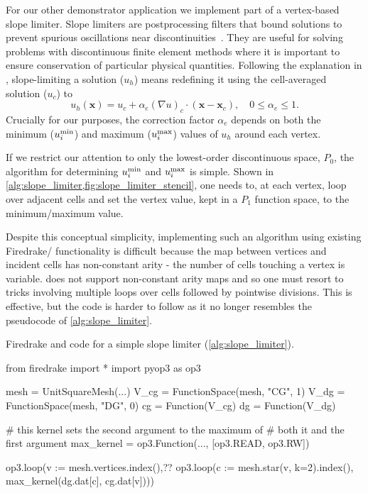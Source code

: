 \documentclass[thesis]{subfiles}
\begin{document}
For our other demonstrator application we implement part of a vertex-based slope limiter.
Slope limiters are postprocessing filters that bound solutions to prevent spurious oscillations near discontinuities~\cite{biswasParallelAdaptiveFinite1994}.
They are useful for solving problems with discontinuous finite element methods where it is important to ensure conservation of particular physical quantities.
Following the explanation in \cite{kuzminVertexbasedHierarchicalSlope2010}, slope-limiting a solution ($u_h$) means redefining it using the cell-averaged solution ($u_c$) to
\begin{equation}
  u_h(\mathbf{x}) = u_c + \alpha_e(\nabla u)_c \cdot (\mathbf{x} - \mathbf{x}_c), \quad 0 \leq \alpha_e \leq 1 .
\end{equation}
Crucially for our purposes, the correction factor $\alpha_e$ depends on both the minimum ($u_i^{\textnormal{min}}$) and maximum ($u_i^{\textnormal{max}}$) values of $u_h$ around each vertex.

If we restrict our attention to only the lowest-order discontinuous space, $P_0$, the algorithm for determining $u_i^{\textnormal{min}}$ and $u_i^{\textnormal{max}}$ is simple.
Shown in \cref{alg:slope_limiter,fig:slope_limiter_stencil}, one needs to, at each vertex, loop over adjacent cells and set the vertex value, kept in a $P_1$ function space, to the minimum/maximum value.

Despite this conceptual simplicity, implementing such an algorithm using existing Firedrake/ functionality is difficult because the map between vertices and incident cells has non-constant arity - the number of cells touching a vertex is variable.
 does not support non-constant arity maps and so one must resort to tricks involving multiple loops over cells followed by pointwise divisions.
This is effective, but the code is harder to follow as it no longer resembles the pseudocode of \cref{alg:slope_limiter}.

\begin{listing}
  \centering
  \caption{
    Firedrake and  code for a simple slope limiter (\cref{alg:slope_limiter}).
  }
  \begin{minipage}{.9\textwidth}
    \begin{pyalg2}
      from firedrake import *
      import pyop3 as op3

      mesh = UnitSquareMesh(...)
      V_cg = FunctionSpace(mesh, "CG", 1)
      V_dg = FunctionSpace(mesh, "DG", 0)
      cg = Function(V_cg)
      dg = Function(V_dg)

      # this kernel sets the second argument to the maximum of
      # both it and the first argument
      max_kernel = op3.Function(..., [op3.READ, op3.RW])

      op3.loop(v := mesh.vertices.index(),?\label{code:slope_limiter_expr}?
               op3.loop(c := mesh.star(v, k=2).index(),
                        max_kernel(dg.dat[c], cg.dat[v])))
    \end{pyalg2}
  \end{minipage}
  \label{listing:app2_code}
\end{listing}
\end{document}
